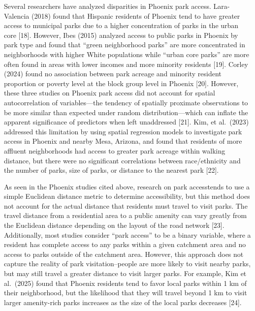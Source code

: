 \documentclass[
  sn-basic,
]{sn-jnl}
\begin{document}
Several researchers have analyzed disparities in Phoenix park access.
Lara-Valencia (2018) found that Hispanic residents of Phoenix tend to
have greater access to municipal parks due to a higher concentration of
parks in the urban core {[}18{]}. However, Ibes (2015) analyzed access
to public parks in Phoenix by park type and found that ``green
neighborhood parks'' are more concentrated in neighborhoods with higher
White populations while ``urban core parks'' are more often found in
areas with lower incomes and more minority residents {[}19{]}. Corley
(2024) found no association between park acreage and minority resident
proportion or poverty level at the block group level in Phoenix
{[}20{]}. However, these three studies on Phoenix park access did not
account for spatial autocorrelation of variables---the tendency of
spatially proximate observations to be more similar than expected under
random distribution---which can inflate the apparent significance of
predictors when left unaddressed {[}21{]}. Kim, et al.~(2023) addressed
this limitation by using spatial regression models to investigate park
access in Phoenix and nearby Mesa, Arizona, and found that residents of
more affluent neighborhoods had access to greater park acreage within
walking distance, but there were no significant correlations between
race/ethnicity and the number of parks, size of parks, or distance to
the nearest park {[}22{]}.

As seen in the Phoenix studies cited above, research on park accesstends
to use a simple Euclidean distance metric to determine accessibility,
but this method does not account for the actual distance that residents
must travel to visit parks. The travel distance from a residential area
to a public amenity can vary greatly from the Euclidean distance
depending on the layout of the road network {[}23{]}. Additionally, most
studies consider ``park access'' to be a binary variable, where a
resident has complete access to any parks within a given catchment area
and no access to parks outside of the catchment area. However, this
approach does not capture the reality of park visitation--people are
more likely to visit nearby parks, but may still travel a greater
distance to visit larger parks. For example, Kim et al.~(2025) found
that Phoenix residents tend to favor local parks within 1 km of their
neighborhood, but the likelihood that they will travel beyond 1 km to
visit larger amenity-rich parks increases as the size of the local parks
decreases {[}24{]}.
\end{document}
